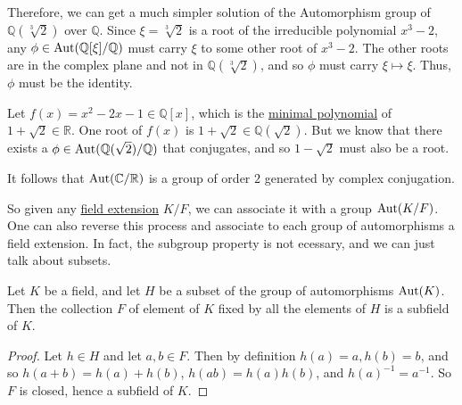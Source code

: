   \begin{example}
    \label{ex:recomputing-autq213q}
    Therefore, we can get a much simpler solution of the Automorphism group of $\mathbb{Q}(\sqrt[3]{2})$ over $\mathbb{Q}$. Since $\xi = \sqrt[3]{2}$ is a root of the irreducible polynomial $x^3 - 2$, any $\phi \in \operatorname{Aut}(\mathbb{Q}[\xi]/\mathbb{Q})$ must carry $\xi$ to some other root of $x^3 - 2$. The other roots are in the complex plane and not in $\mathbb{Q}(\sqrt[3]{2})$, and so $\phi$ must carry $\xi \mapsto \xi$. Thus, $\phi$ must be the identity. 
  \end{example}

  \begin{example}
    \label{ex:computing-autq1sqrt2q}
    Let $f(x) = x^2 - 2x - 1 \in \mathbb{Q}[x]$, which is the \hyperref[def:min_poly]{minimal polynomial} of $1 + \sqrt{2} \in \mathbb{R}$. One root of $f(x)$ is $1 + \sqrt{2} \in \mathbb{Q}(\sqrt{2})$. But we know that there exists a $\phi \in \operatorname{Aut}(\mathbb{Q}(\sqrt{2})/\mathbb{Q})$ that conjugates, and so $1 - \sqrt{2}$ must also be a root. 
  \end{example} 

  \begin{example}
    \label{ex:computing-autcr}
    It follows that $\operatorname{Aut}(\mathbb{C}/\mathbb{R})$ is a group of order $2$ generated by complex conjugation. 
  \end{example} 

  So given any \hyperref[def:field-extension]{field extension} $K/F$, we can associate it with a group $\operatorname{Aut}(K/F)$. One can also reverse this process and associate to each group of automorphisms a field extension. In fact, the subgroup property is not ecessary, and we can just talk about subsets. 

  \begin{theorem}[]
    \label{thm:field-subset-group-automorphisms-collection}
    Let $K$ be a field, and let $H$ be a subset of the group of automorphisms $\operatorname{Aut}(K)$. Then the collection $F$ of element of $K$ fixed by all the elements of $H$ is a subfield of $K$. 
  \end{theorem}
  \begin{proof}
    Let $h \in H$ and let $a, b \in F$. Then by definition $h(a) = a, h(b) = b$, and so $h(a + b) = h(a) + h(b)$, $h(ab) = h(a) h(b)$, and $h(a)^{-1} = a^{-1}$. So $F$ is closed, hence a subfield of $K$. 
  \end{proof}


